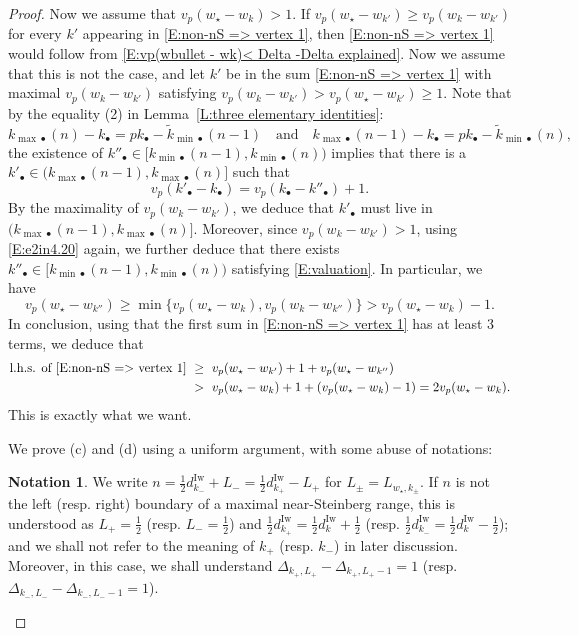 \documentclass[12pt]{amsart}
\theoremstyle{definition}
\newtheorem{notation}[subsection]{Notation}
\numberwithin{equation}{subsection}
\newcommand{\Iw}{\mathrm{Iw}}
\begin{document}
\begin{proof}
Now we assume that $v_p(w_\star - w_k) >1$.
If $v_p(w_\star - w_{k'}) \geq  v_p(w_k-w_{k'})$ for every $k'$ appearing in \eqref{E:non-nS => vertex 1}, then \eqref{E:non-nS => vertex 1} would follow from \eqref{E:vp(wbullet - wk)< Delta -Delta explained}. Now we assume that this is not the case, and let $k'$ be in the sum \eqref{E:non-nS => vertex 1} with maximal $v_p(w_k-w_{k'})$ satisfying $v_p(w_k-w_{k'})>v_p(w_\star - w_{k'}) \geq  1$. Note that by the equality (2) in Lemma~\ref{L:three elementary identities}:
\begin{equation}
\label{E:e2in4.20}
k_{{\max}\bullet}(n) - k_\bullet = pk_\bullet - \tilde k_{{\min}\bullet}(n -1)  \quad \textrm{and} \quad k_{{\max}\bullet}(n-1) - k_\bullet = pk_\bullet - \tilde k_{{\min}\bullet}(n),
\end{equation}
the existence of $k''_\bullet \in [k_{{\min}\bullet}(n-1) , k_{{\min}\bullet}(n))$ implies that there is a $k'_\bullet\in (k_{{\max}\bullet}(n-1), k_{{\max}\bullet}(n)]$ such that 
\begin{equation}
\label{E:valuation}
v_p(k'_\bullet - k_\bullet) = v_p(k_\bullet - k''_\bullet) +1.
\end{equation}
By the maximality of $v_p(w_k-w_{k'})$, we deduce that $k'_\bullet$ must live in $(k_{{\max}\bullet}(n-1), k_{{\max}\bullet}(n)]$. Moreover, since $v_p(w_k-w_{k'})>1$, using \eqref{E:e2in4.20} again, we further deduce that there exists $k''_\bullet \in [k_{{\min}\bullet}(n-1) , k_{{\min}\bullet}(n))$ satisfying \eqref{E:valuation}. In particular, we have
$$
v_p(w_\star - w_{k''}) \geq \min\{v_p(w_\star - w_{k}), v_p(w_k - w_{k''}) \} > v_p(w_\star - w_k)-1.
$$
In conclusion, using that the first sum in \eqref{E:non-nS => vertex 1} has at least $3$ terms, we deduce that
\begin{align*}
\textrm{l.h.s. of \eqref{E:non-nS => vertex 1}}\ &\geq \ v_p(w_\star - w_{k'}) + 1 + v_p(w_\star - w_{k''}) \\
 &> \
v_p(w_\star - w_{k})+1 + (v_p(w_\star - w_k)-1) = 2v_p(w_\star - w_{k}).
\end{align*}
This is exactly what we want.

\medskip
We prove (c) and (d) using a uniform argument, with some abuse of notations: 

\begin{notation}\label{Notation:L+ and L-}
	We write $n = \frac 12 d_{k_-}^\Iw + L_- = \frac 12 d_{k_+}^\Iw - L_+$ for $L_\pm= L_{w_\star, k_\pm}$. If $n$ is not the left (resp. right) boundary of a maximal near-Steinberg range, this is understood as $L_+ = \frac 12$ (resp. $L_- = \frac 12$) and $\frac 12d_{k_+}^\Iw = \frac 12 d_k^\Iw +\frac 12$ (resp. $\frac 12d_{k_-}^\Iw = \frac 12 d_k^\Iw -\frac 12$); and we shall not refer to the meaning of $k_+$ (resp. $k_-$) in later discussion. Moreover, in this case, we shall understand $\Delta_{k_+, L_+} - \Delta_{k_+, L_+-1} = 1$ (resp. $\Delta_{k_-, L_-} - \Delta_{k_-, L_--1} = 1$).
\end{notation}



\end{proof}
\end{document}
